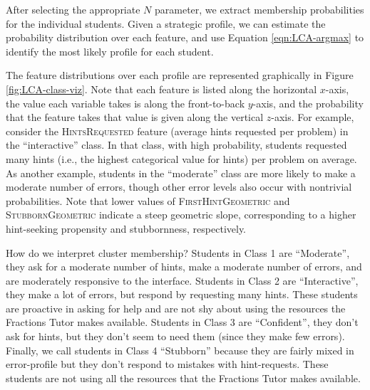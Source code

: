 \documentclass{edm_template}
\newcommand{\ftr}[1]{\textsc{#1}}
\begin{document}
After selecting the appropriate $N$ parameter, we extract membership probabilities for the individual students. Given a strategic profile, we can estimate the probability distribution over each feature, and use Equation \ref{eqn:LCA-argmax} to identify the most likely profile for each student.

The feature distributions over each profile are represented graphically in Figure \ref{fig:LCA-class-viz}. Note that each feature is listed along the horizontal $x$-axis, the value each variable takes is along the front-to-back $y$-axis, and the probability that the feature takes that value is given along the vertical $z$-axis. For example, consider the \ftr{HintsRequested} feature (average hints requested per problem) in the ``interactive'' class. In that class, with high probability, students requested many hints (i.e., the highest categorical value for hints) per problem on average. As another example, students in the ``moderate'' class are more likely to make a moderate number of errors, though other error levels also occur with nontrivial probabilities. Note that lower values of \ftr{FirstHintGeometric} and \ftr{StubbornGeometric} indicate a steep geometric slope, corresponding to a higher hint-seeking propensity and stubbornness, respectively.

How do we interpret cluster membership? Students in Class 1 are ``Moderate'', they ask for a moderate number of hints, make a moderate number of errors, and are moderately responsive to the interface. Students in Class 2 are ``Interactive'', they make a lot of errors, but respond by requesting many hints. These students are proactive in asking for help and are not shy about using the resources the Fractions Tutor makes available. Students in Class 3 are ``Confident'', they don't ask for hints, but they don't seem to need them (since they make few errors). Finally, we call students in Class 4 ``Stubborn'' because they are fairly mixed in error-profile but they don't respond to mistakes with hint-requests. These students are not using all the resources that the Fractions Tutor makes available.
\end{document}
